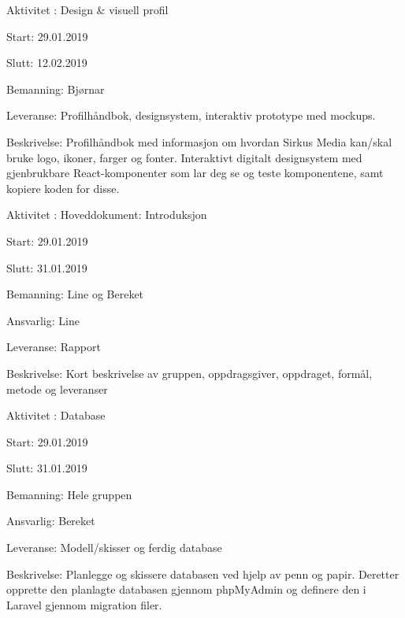 \documentclass[11pt,a4paper]{report}
\begin{document}
\begin{compactdesc}
	\item [Aktivitet \arabic{aktivitetTeller}:] Design \& visuell profil
	\begin{compactitem}
	\item Start: 29.01.2019
	\item Slutt: 12.02.2019
	\item Bemanning: Bjørnar
	\item Leveranse: Profilhåndbok, designsystem, interaktiv prototype med mockups. 
	\item Beskrivelse: Profilhåndbok med informasjon om hvordan Sirkus Media kan/skal bruke logo, ikoner, farger og fonter. Interaktivt digitalt designsystem med gjenbrukbare React-komponenter som lar deg se og teste komponentene, samt kopiere koden for disse.
	\addtocounter{aktivitetTeller}{1}
	\end{compactitem}
	
	\item [Aktivitet \arabic{aktivitetTeller}:] Hoveddokument: Introduksjon
	\begin{compactitem}
	\item Start: 29.01.2019
	\item Slutt: 31.01.2019
	\item Bemanning: Line og Bereket
	\item Ansvarlig: Line
	\item Leveranse: Rapport
	\item Beskrivelse: Kort beskrivelse av gruppen, oppdragsgiver, oppdraget, formål, metode og leveranser
	\addtocounter{aktivitetTeller}{1}
	\end{compactitem}
	
	\item [Aktivitet \arabic{aktivitetTeller}:] Database 
	\begin{compactitem}
	\item Start: 29.01.2019
	\item Slutt: 31.01.2019
	\item Bemanning: Hele gruppen
	\item Ansvarlig: Bereket
	\item Leveranse: Modell/skisser og ferdig database
	\item Beskrivelse: Planlegge og skissere databasen ved hjelp av penn og papir. Deretter opprette den planlagte databasen gjennom phpMyAdmin og definere den i Laravel gjennom migration filer. 
	\addtocounter{aktivitetTeller}{1}
	\end{compactitem}
	

\end{compactdesc}
\end{document}
